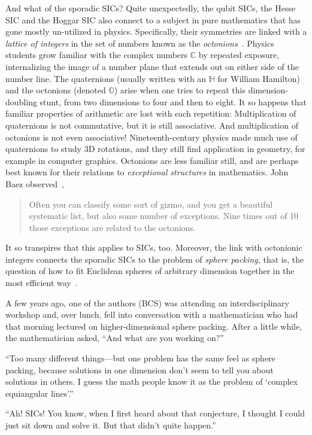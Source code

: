 \documentclass[aps,pra,superscriptaddress,10pt,tightenlines,twocolumn,nofootinbib]{revtex4}
\begin{document}
And what of the sporadic SICs?  Quite unexpectedly, the qubit SICs, the Hesse SIC and the Hoggar SIC
also connect to a subject in pure mathematics that has gone mostly un-utilized in physics.
Specifically, their symmetries are linked with a {\it lattice of integers\/} in
the set of numbers known as the {\it octonions}~\cite{stacey-sporadic}.
Physics students grow familiar with the complex numbers $\mathbb{C}$
by repeated exposure, internalizing the image of a number plane that
extends out on either side of the number line.  The quaternions
(usually written with an $\mathbb{H}$ for William Hamilton) and the octonions (denoted $\mathbb{O}$) arise when one tries to repeat
this dimension-doubling stunt, from two dimensions to four and then to
eight.  It so happens that familiar properties of arithmetic are lost
with each repetition: Multiplication of quaternions is not
commutative, but it is still associative.  And multiplication of
octonions is not even associative!  Nineteenth-century physics made much use
of quaternions to study 3D rotations, and they still find application
in geometry, for example in computer graphics.  Octonions are less
familiar still, and are perhaps best known for their relations to {\it
  exceptional structures\/} in mathematics.  John Baez
observed~\cite{baez-plus},
\begin{quote}
\noindent  Often you can classify some sort of gizmo, and you get
  a beautiful systematic list, but also some number of
  exceptions. Nine times out of 10 those exceptions are related to the
  octonions.
\end{quote}
It so transpires that this applies to SICs, too.  Moreover, the link with octonionic integers connects the sporadic SICs to the problem of {\it sphere packing,} that is, the question of how to fit Euclidean spheres of arbitrary dimension together in the most efficient way~\cite{viazovska2016}.

A few years ago, one of the authors (BCS) was attending an
interdisciplinary workshop and, over lunch, fell into conversation
with a mathematician who had that morning lectured on
higher-dimensional sphere packing.  After a little while, the
mathematician asked, ``And what are you working on?''

``Too many different things---but one problem has the same feel as
sphere packing, because solutions in one dimension don't seem to tell
you about solutions in others.  I guess the math people know it as the
problem of `complex equiangular lines'.''

``Ah! SICs!  You know, when I first heard about that conjecture, I
thought I could just sit down and solve it.  But that didn't quite
happen.''
\end{document}
